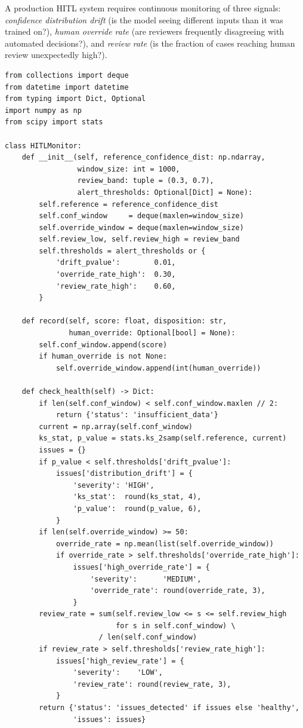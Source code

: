 A production HITL system requires continuous monitoring of three signals: \emph{confidence distribution drift} (is the model seeing different inputs than it was trained on?), \emph{human override rate} (are reviewers frequently disagreeing with automated decisions?), and \emph{review rate} (is the fraction of cases reaching human review unexpectedly high?).

\begin{lstlisting}[style=python, caption={HITL system health monitor}]
from collections import deque
from datetime import datetime
from typing import Dict, Optional
import numpy as np
from scipy import stats

class HITLMonitor:
    def __init__(self, reference_confidence_dist: np.ndarray,
                 window_size: int = 1000,
                 review_band: tuple = (0.3, 0.7),
                 alert_thresholds: Optional[Dict] = None):
        self.reference = reference_confidence_dist
        self.conf_window     = deque(maxlen=window_size)
        self.override_window = deque(maxlen=window_size)
        self.review_low, self.review_high = review_band
        self.thresholds = alert_thresholds or {
            'drift_pvalue':        0.01,
            'override_rate_high':  0.30,
            'review_rate_high':    0.60,
        }

    def record(self, score: float, disposition: str,
               human_override: Optional[bool] = None):
        self.conf_window.append(score)
        if human_override is not None:
            self.override_window.append(int(human_override))

    def check_health(self) -> Dict:
        if len(self.conf_window) < self.conf_window.maxlen // 2:
            return {'status': 'insufficient_data'}
        current = np.array(self.conf_window)
        ks_stat, p_value = stats.ks_2samp(self.reference, current)
        issues = {}
        if p_value < self.thresholds['drift_pvalue']:
            issues['distribution_drift'] = {
                'severity': 'HIGH',
                'ks_stat':  round(ks_stat, 4),
                'p_value':  round(p_value, 6),
            }
        if len(self.override_window) >= 50:
            override_rate = np.mean(list(self.override_window))
            if override_rate > self.thresholds['override_rate_high']:
                issues['high_override_rate'] = {
                    'severity':      'MEDIUM',
                    'override_rate': round(override_rate, 3),
                }
        review_rate = sum(self.review_low <= s <= self.review_high
                          for s in self.conf_window) \
                      / len(self.conf_window)
        if review_rate > self.thresholds['review_rate_high']:
            issues['high_review_rate'] = {
                'severity':    'LOW',
                'review_rate': round(review_rate, 3),
            }
        return {'status': 'issues_detected' if issues else 'healthy',
                'issues': issues}
\end{lstlisting}

